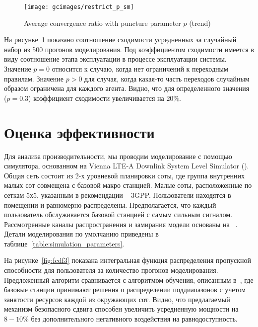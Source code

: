 \begin{figure}
    \centering
    \texttt{[image: gcimages/restrict\_p\_sm]}
    \caption{Average convergence ratio with puncture parameter $p$ (trend)}
    \label{fig:restrict_profit}
\end{figure}

На рисунке~\ref{fig:restrict_profit} показано соотношение сходимости усредненных за случайный набор из 500 прогонов моделирования. Под коэффициентом сходимости имеется в виду соотношение этапа эксплуатации в процессе эксплуатации системы. Значение $p = 0$ относится к случаю, когда нет ограничений к переходным правилам. Значение $p>0$ для случая, когда какая-то часть переходов случайным образом ограничена для каждого агента. Видно, что для определенного значения ($p=0.3$) коэффициент сходимости увеличивается на $20\%$.


\section{Оценка эффективности}

Для анализа производительности, мы проводим моделирование с помощью симулятора, основанном на Vienna LTE-A Downlink System Level Simulator (\cite{VTC2010}). Общая сеть состоит из 2-х уровневой планировки соты, где группа внутренних малых сот совмещена с базовой макро станцией. Малые соты, расположенные по сеткам 5х5, указанным в рекомендации ~\cite{R4-092042} 3GPP. Пользователи находятся в помещении и равномерно распределены. Предполагается, что каждый пользователь обслуживается базовой станцией с самым сильным сигналом. Рассмотренные каналы распространения и замирания модели основаны на ~\cite{R4-092042}. Детали моделирования по умолчанию приведены в таблице~\ref{table:simulation_parameters}.

На рисунке~\ref{fig:fcdf3} показана интегральная функция распределения пропускной способности для пользователя за количество прогонов моделирования. Предложенный алгоритм сравнивается с алгоритмом обучения, описанным в~\cite{mab}, где базовые станции принимают решения о распределении поддиапазонов с учетом занятости ресурсов каждой из окружающих сот. Видно, что предлагаемый механизм безопасного сдвига способен увеличить усредненную мощности на $8 - 10\%$ без дополнительного негативного воздействия на равнодоступность.

